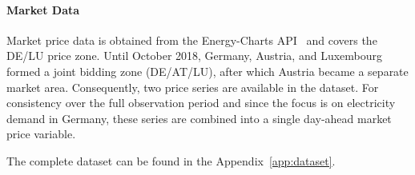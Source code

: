 \paragraph*{Market Data}
Market price data is obtained from the Energy-Charts API~\cite{burger_2025_energy-charts} and covers the DE/LU price zone. Until October 2018, Germany, Austria, and Luxembourg formed a joint bidding zone (DE/AT/LU), after which Austria became a separate market area. Consequently, two price series are available in the dataset. For consistency over the full observation period and since the focus is on electricity demand in Germany, these series are combined into a single day-ahead market price variable.

The complete dataset can be found in the Appendix~\ref{app:dataset}.